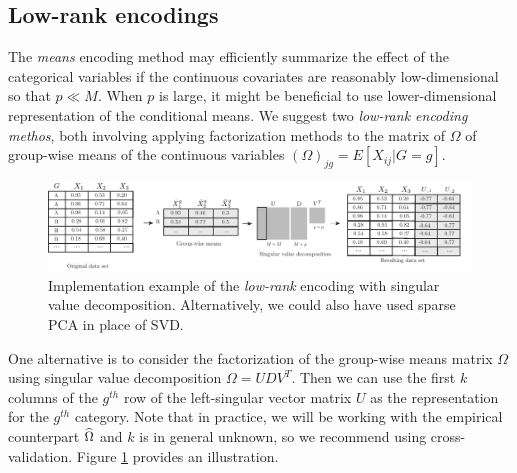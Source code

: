 \documentclass{article}
\theoremstyle{plain}
\theoremstyle{definition}
\theoremstyle{remark}
\begin{document}
\subsection{Low-rank encodings}
\label{subsec:lowrank}

The \emph{means} encoding method may efficiently summarize the effect of the categorical variables if the continuous covariates are reasonably low-dimensional so that $p \ll M$. When $p$ is large, it might be beneficial to use lower-dimensional representation of the conditional means. We suggest two  \emph{low-rank encoding methos}, both involving applying factorization methods to the matrix of $\Omega$ of group-wise means of the continuous variables $(\Omega)_{jg} = E[X_{ij} | G=g]$.
\begin{figure}[H]
  \centering
  \includegraphics[width=\textwidth]{figures/lowrank_encoding.pdf}
  \caption{Implementation example of the \emph{low-rank} encoding with singular value decomposition. Alternatively, we could also have used sparse PCA in place of SVD.}
  \label{fig:lowrank_encoding}
\end{figure}

One alternative is to consider the factorization of the group-wise means matrix $\Omega$ using singular value decomposition $\Omega = U D V^{T}$. Then we can use the first $k$ columns of the $g^{th}$ row of the left-singular vector matrix $U$ as the representation for the $g^{th}$ category. Note that in practice, we will be working with the empirical counterpart $\widehat{\Omega}$ and $k$ is in general unknown, so we recommend using cross-validation. Figure \ref{fig:lowrank_encoding} provides an illustration.
\end{document}
